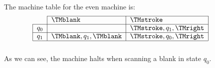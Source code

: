 \documentclass[../../../include/open-logic-section]{subfiles}
\begin{document}
\begin{ex}
The machine table for the even machine is:
\[
\centering
\begin{tabular}{lllll}
\cline{2-3}
\multicolumn{1}{l|}{}      & \multicolumn{1}{l|}{$\TMblank$}                
& \multicolumn{1}{l|}{$\TMstroke$}                &  &  \\ \cline{1-3}
\multicolumn{1}{|l|}{$q_0$} & \multicolumn{1}{l|}{}                          
& \multicolumn{1}{l|}{$\TMstroke, q_1, \TMright$} &  &  \\ \cline{1-3}
\multicolumn{1}{|l|}{$q_1$} & \multicolumn{1}{l|}{$\TMblank, q_1, \TMblank$} 
& \multicolumn{1}{l|}{$\TMstroke, q_0, \TMright$} &  &  \\ \cline{1-3}
                           &                                                &                                                 &  & 
\end{tabular}
\]
As we can see, the machine halts when scanning a blank in state $q_0$.
\end{ex}
\end{document}
